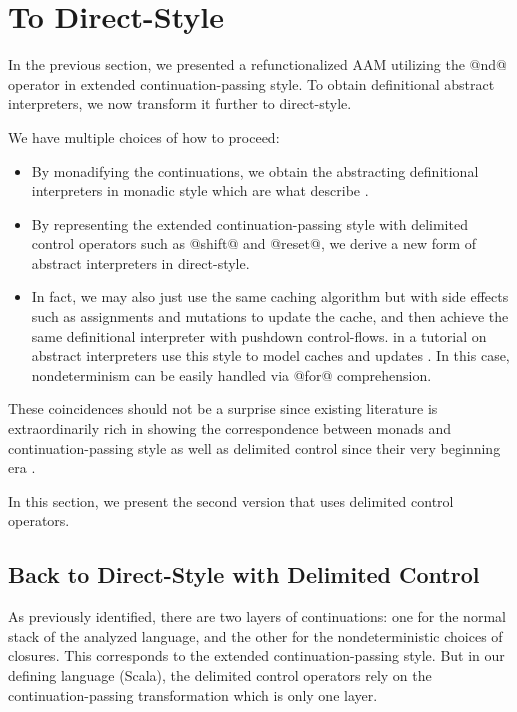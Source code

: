 \documentclass[acmsmall, review]{acmart}\settopmatter{}
\begin{document}
\section{To Direct-Style} \label{directstyle}

In the previous section, we presented a refunctionalized AAM utilizing the @nd@ operator
in extended continuation-passing style.
To obtain definitional abstract interpreters, we now transform it further to direct-style.

We have multiple choices of how to proceed:
\begin{itemize}
  \item By monadifying the continuations, we obtain the abstracting
    definitional interpreters in monadic style which are what \citeauthor{darais2017abstracting}
    describe \cite{darais2017abstracting}.
  \item By representing the extended continuation-passing style with delimited control operators
    such as @shift@ and @reset@, we derive a new form of abstract interpreters in direct-style.
  \item In fact, we may also just use the same caching algorithm but with side effects such as
    assignments and mutations to update the cache, and then achieve the same definitional 
    interpreter with pushdown control-flows. \citeauthor{friedman-ai} in a tutorial on abstract 
    interpreters use this style to model caches and updates \cite{friedman-ai}.
    In this case, nondeterminism can be easily handled via @for@ comprehension. 
\end{itemize}

These coincidences should not be a surprise since existing literature is extraordinarily rich
in showing the correspondence between monads and continuation-passing style as well as
delimited control since their very beginning era \cite{Danvy:1990:AC:91556.91622, wadler1992essence,
danvy1992representing, moggi1991notions}.

In this section, we present the second version that uses delimited control operators.

\subsection{Back to Direct-Style with Delimited Control} \label{uncps}

As previously identified, there are two layers of continuations: one for the normal stack 
of the analyzed language, and the other for the nondeterministic choices of closures.
This corresponds to the extended continuation-passing style.
But in our defining language (Scala), the delimited control operators rely on the continuation-passing 
transformation which is only one layer.
\end{document}

